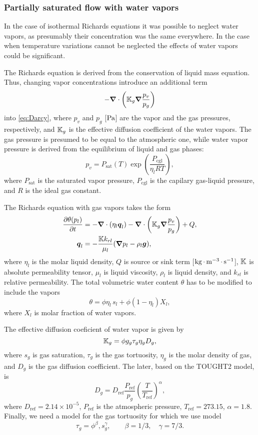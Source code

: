 \subsubsection{Partially saturated flow with water vapors}


In the case of isothermal Richards equations it was possible to neglect water vapors, as 
presumably their concentration was the same everywhere. 
In the case when temperature variations cannot be neglected the effects of water vapors could be significant.

The Richards equation is derived from the conservation of liquid mass equation.
Thus, changing vapor concentrations introduce an additional term 
$$
  -{\boldsymbol{\nabla}} \cdot \left( {\mathbb K}_g {\boldsymbol{\nabla}} \frac{p_v}{p_g} \right) 
$$
into \eqref{eq:Darcy}, where 
$p_v$ and $p_g$ [${\rm Pa}$] are the vapor and the gas pressures, respectively,
and
${\mathbb K}_g$ is the effective diffusion coefficient of the water vapors.
The gas pressure is presumed to be equal to the atmospheric one,
while water vapor pressure is derived from the equilibrium of liquid and gas phases:
\[
  p_v = P_\text{sat} (T) \exp\left(\frac{P_\text{cgl}}{\eta_l RT}\right),
\] 
where 
$P_\text{sat}$ is the saturated vapor pressure,
$P_\text{cgl}$ is the capilary gas-liquid pressure, and 
$R$ is the ideal gas constant.  

The Richards equation with gas vapors takes the form
\begin{subequations}\label{eq:Richards with vapors}
\begin{align}
  \frac{\partial \theta(p_l)}{\partial t} 
  &= 
  -{\boldsymbol{\nabla}} \cdot (\eta_l {\boldsymbol{q}}_l)
  -{\boldsymbol{\nabla}} \cdot \left( {\mathbb K}_g {\boldsymbol{\nabla}} \frac{p_v}{p_g} \right) 
  + Q,
  \\
  {\boldsymbol{q}}_l 
  &= 
  -\frac{{\mathbb K} k_{rl}}{\mu_l} ({\boldsymbol{\nabla}} p_l - \rho_l {\boldsymbol{g}}),
\end{align}
\end{subequations}
where 
$\eta_l$ is the molar liquid density,
$Q$ is source or sink term [${\rm kg} {\,\cdot\,} {\rm m}^{-3} {\,\cdot\,} {\rm s}^{-1}$],
${\mathbb K}$ is absolute permeability tensor,
$\mu_l$ is liquid viscosity,
$\rho_l$ is liquid density, and
$k_{rl}$ is relative permeability.
The total volumetric water content $\theta$ has to be modified to include 
the vapors
$$
  \theta = \phi \eta_l\, s_l + \phi (1-\eta_l) X_l,
$$
where $X_l$ is molar fraction of water vapors.

The effective diffusion coeficient of water vapor is given by 
\[
  {\mathbb K}_g = \phi g_g \tau_g \eta_g D_g,
\]
where $s_g$ is gas saturation, 
$\tau_g$ is the gas tortuosity,
$\eta_g$ is the molar density of gas, and 
$D_g$ is the gas diffusion coefficient.
The later, based on the TOUGHT2 model, is 
\[
  D_g = D_\text{ref} \frac{P_\text{ref}}{p_g} \left(\frac{T}{T_\text{ref}}\right)^\alpha,
\]
where 
$D_\text{ref} = 2.14\times 10^{-5}$,
$P_\text{ref}$ is the atmospheric pressure,
$T_\text{ref} = 273.15$,
$\alpha=1.8$.
Finally, we need a model for the gas tortuosity
for which we use \citet{millington1961permeability} 
model
\[
  \tau_g = \phi^\beta, s_g^\gamma,
  \qquad \beta = 1/3, \quad \gamma = 7/3.
\]




